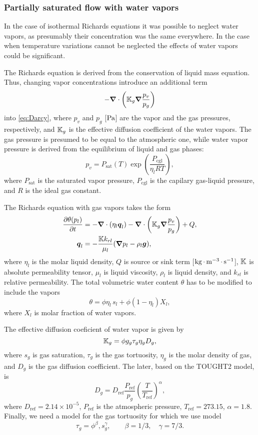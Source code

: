 \subsubsection{Partially saturated flow with water vapors}


In the case of isothermal Richards equations it was possible to neglect water vapors, as 
presumably their concentration was the same everywhere. 
In the case when temperature variations cannot be neglected the effects of water vapors could be significant.

The Richards equation is derived from the conservation of liquid mass equation.
Thus, changing vapor concentrations introduce an additional term 
$$
  -{\boldsymbol{\nabla}} \cdot \left( {\mathbb K}_g {\boldsymbol{\nabla}} \frac{p_v}{p_g} \right) 
$$
into \eqref{eq:Darcy}, where 
$p_v$ and $p_g$ [${\rm Pa}$] are the vapor and the gas pressures, respectively,
and
${\mathbb K}_g$ is the effective diffusion coefficient of the water vapors.
The gas pressure is presumed to be equal to the atmospheric one,
while water vapor pressure is derived from the equilibrium of liquid and gas phases:
\[
  p_v = P_\text{sat} (T) \exp\left(\frac{P_\text{cgl}}{\eta_l RT}\right),
\] 
where 
$P_\text{sat}$ is the saturated vapor pressure,
$P_\text{cgl}$ is the capilary gas-liquid pressure, and 
$R$ is the ideal gas constant.  

The Richards equation with gas vapors takes the form
\begin{subequations}\label{eq:Richards with vapors}
\begin{align}
  \frac{\partial \theta(p_l)}{\partial t} 
  &= 
  -{\boldsymbol{\nabla}} \cdot (\eta_l {\boldsymbol{q}}_l)
  -{\boldsymbol{\nabla}} \cdot \left( {\mathbb K}_g {\boldsymbol{\nabla}} \frac{p_v}{p_g} \right) 
  + Q,
  \\
  {\boldsymbol{q}}_l 
  &= 
  -\frac{{\mathbb K} k_{rl}}{\mu_l} ({\boldsymbol{\nabla}} p_l - \rho_l {\boldsymbol{g}}),
\end{align}
\end{subequations}
where 
$\eta_l$ is the molar liquid density,
$Q$ is source or sink term [${\rm kg} {\,\cdot\,} {\rm m}^{-3} {\,\cdot\,} {\rm s}^{-1}$],
${\mathbb K}$ is absolute permeability tensor,
$\mu_l$ is liquid viscosity,
$\rho_l$ is liquid density, and
$k_{rl}$ is relative permeability.
The total volumetric water content $\theta$ has to be modified to include 
the vapors
$$
  \theta = \phi \eta_l\, s_l + \phi (1-\eta_l) X_l,
$$
where $X_l$ is molar fraction of water vapors.

The effective diffusion coeficient of water vapor is given by 
\[
  {\mathbb K}_g = \phi g_g \tau_g \eta_g D_g,
\]
where $s_g$ is gas saturation, 
$\tau_g$ is the gas tortuosity,
$\eta_g$ is the molar density of gas, and 
$D_g$ is the gas diffusion coefficient.
The later, based on the TOUGHT2 model, is 
\[
  D_g = D_\text{ref} \frac{P_\text{ref}}{p_g} \left(\frac{T}{T_\text{ref}}\right)^\alpha,
\]
where 
$D_\text{ref} = 2.14\times 10^{-5}$,
$P_\text{ref}$ is the atmospheric pressure,
$T_\text{ref} = 273.15$,
$\alpha=1.8$.
Finally, we need a model for the gas tortuosity
for which we use \citet{millington1961permeability} 
model
\[
  \tau_g = \phi^\beta, s_g^\gamma,
  \qquad \beta = 1/3, \quad \gamma = 7/3.
\]




